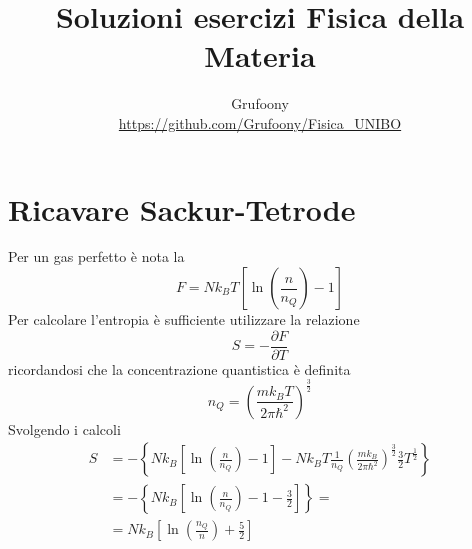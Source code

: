\documentclass[a4paper]{article}
\begin{document}
	\title{Soluzioni esercizi Fisica della Materia}
	\author{Grufoony\\\url{https://github.com/Grufoony/Fisica_UNIBO}}
	\maketitle

    \section*{Ricavare Sackur-Tetrode}
        Per un gas perfetto è nota la
        \begin{equation*}
            F=Nk_BT\left[\ln\left(\frac{n}{n_Q}\right)-1\right]
        \end{equation*}
        Per calcolare l'entropia è sufficiente utilizzare la relazione
        \begin{equation*}
            S=-\frac{\partial F}{\partial T}
        \end{equation*}
        ricordandosi che la concentrazione quantistica è definita
        \begin{equation*}
            n_Q=\left(\frac{mk_BT}{2\pi\hbar^2}\right)^{\frac{3}{2}}
        \end{equation*}
        Svolgendo i calcoli
        \begin{equation*}
            \begin{split}
                S&=-\left\{Nk_B\left[\ln\left(\frac{n}{n_Q}\right)-1\right]-Nk_BT\frac{1}{n_Q}\left(\frac{mk_B}{2\pi\hbar^2}\right)^{\frac{3}{2}}\frac{3}{2}T^{\frac{1}{2}}\right\}\\
                &=-\left\{Nk_B\left[\ln\left(\frac{n}{n_Q}\right)-1-\frac{3}{2}\right]\right\}=\\
                &=Nk_B\left[\ln\left(\frac{n_Q}{n}\right)+\frac{5}{2}\right]
            \end{split}
        \end{equation*}
        \begin{center}
        \end{center}
\end{document}
